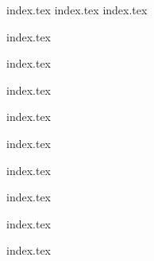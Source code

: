 \documentclass{article}
\begin{document}

{index.tex}
{index.tex}
{index.tex}

\newpage


{index.tex}

\newpage

{index.tex}

\newpage

{index.tex}

\newpage

{index.tex}

\newpage

{index.tex}

\newpage

{index.tex}

\newpage

{index.tex}

\newpage

{index.tex}

\newpage

{index.tex}

\newpage
\end{document}
